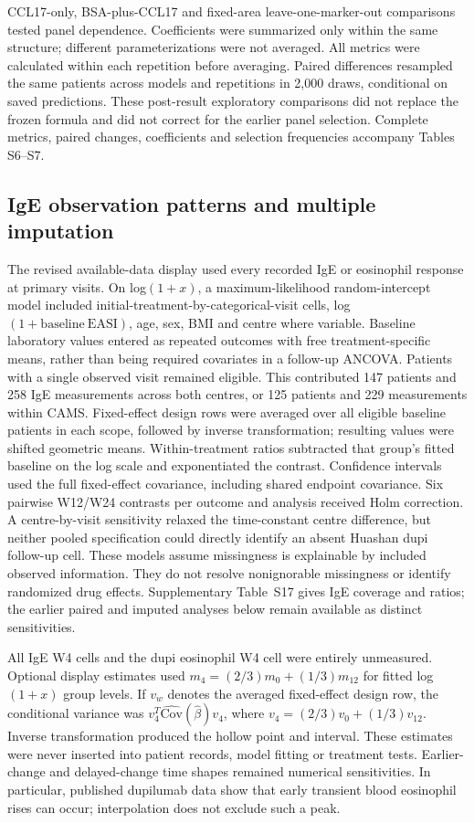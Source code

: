 \documentclass[10pt,a4paper]{article}
\begin{document}
CCL17-only, BSA-plus-CCL17 and fixed-area leave-one-marker-out comparisons tested panel dependence. Coefficients were summarized only within the same structure; different parameterizations were not averaged. All metrics were calculated within each repetition before averaging. Paired differences resampled the same patients across models and repetitions in 2,000 draws, conditional on saved predictions. These post-result exploratory comparisons did not replace the frozen formula and did not correct for the earlier panel selection. Complete metrics, paired changes, coefficients and selection frequencies accompany Tables S6--S7.

\subsection*{IgE observation patterns and multiple imputation}
The revised available-data display used every recorded IgE or eosinophil response at primary visits. On log$(1+x)$, a maximum-likelihood random-intercept model included initial-treatment-by-categorical-visit cells, log$(1+\mathrm{baseline\ EASI})$, age, sex, BMI and centre where variable. Baseline laboratory values entered as repeated outcomes with free treatment-specific means, rather than being required covariates in a follow-up ANCOVA. Patients with a single observed visit remained eligible. This contributed 147 patients and 258 IgE measurements across both centres, or 125 patients and 229 measurements within CAMS. Fixed-effect design rows were averaged over all eligible baseline patients in each scope, followed by inverse transformation; resulting values were shifted geometric means. Within-treatment ratios subtracted that group's fitted baseline on the log scale and exponentiated the contrast. Confidence intervals used the full fixed-effect covariance, including shared endpoint covariance. Six pairwise W12/W24 contrasts per outcome and analysis received Holm correction. A centre-by-visit sensitivity relaxed the time-constant centre difference, but neither pooled specification could directly identify an absent Huashan dupi follow-up cell. These models assume missingness is explainable by included observed information. They do not resolve nonignorable missingness or identify randomized drug effects. Supplementary Table~S17 gives IgE coverage and ratios; the earlier paired and imputed analyses below remain available as distinct sensitivities.

All IgE W4 cells and the dupi eosinophil W4 cell were entirely unmeasured. Optional display estimates used $m_4=(2/3)m_0+(1/3)m_{12}$ for fitted log$(1+x)$ group levels. If $v_w$ denotes the averaged fixed-effect design row, the conditional variance was $v_4^T\widehat{\mathrm{Cov}}(\widehat\beta)v_4$, where $v_4=(2/3)v_0+(1/3)v_{12}$. Inverse transformation produced the hollow point and interval. These estimates were never inserted into patient records, model fitting or treatment tests. Earlier-change and delayed-change time shapes remained numerical sensitivities. In particular, published dupilumab data show that early transient blood eosinophil rises can occur; interpolation does not exclude such a peak.\citep{wechsler2022eosinophils}
\end{document}
